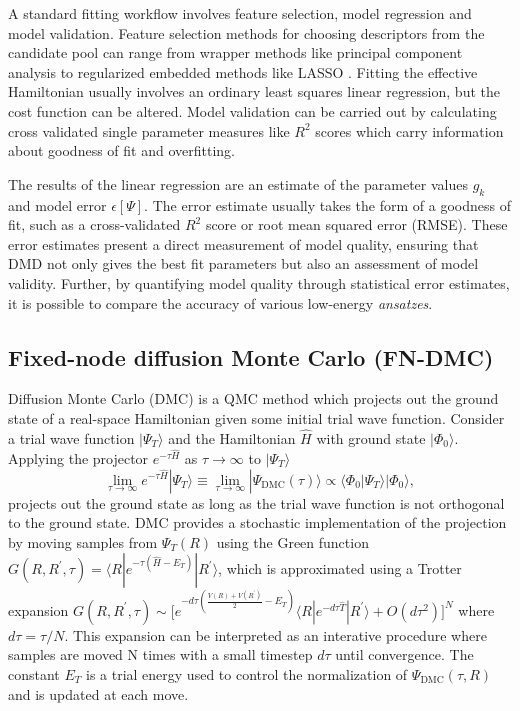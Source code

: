\documentclass[12pt]{article}
\begin{document}
A standard fitting workflow involves feature selection, model regression and model validation.
Feature selection methods for choosing descriptors from the candidate pool can range from wrapper methods like principal component analysis \cite{pearson_karl_1901_1430636} to regularized embedded methods like LASSO \cite{10.2307/2346178, doi:10.1137/S0895479897326432, Zou05regularizationand}. 
Fitting the effective Hamiltonian usually involves an ordinary least squares linear regression, but the cost function can be altered.
Model validation can be carried out by calculating cross validated single parameter measures like $R^2$ scores which carry information about goodness of fit and overfitting.

The results of the linear regression are an estimate of the parameter values $g_k$ and model error $\epsilon[\Psi]$.
The error estimate usually takes the form of a goodness of fit, such as a cross-validated $R^2$ score or root mean squared error (RMSE).
These error estimates present a direct measurement of model quality, ensuring that DMD not only gives the best fit parameters but also an assessment of model validity.
Further, by quantifying model quality through statistical error estimates, it is possible to compare the accuracy of various low-energy \textit{ansatzes}.

\subsection{Fixed-node diffusion Monte Carlo (FN-DMC)}
Diffusion Monte Carlo (DMC) is a QMC method which projects out the ground state of a real-space Hamiltonian given some initial trial wave function.
Consider a trial wave function $|\Psi_T\rangle$ and the Hamiltonian $\hat{H}$ with ground state $|\Phi_0\rangle$. 
Applying the projector $e^{-\tau \hat{H}}$ as $\tau \rightarrow \infty$ to $|\Psi_T \rangle$
\begin{equation}
\lim_{\tau \rightarrow \infty} e^{-\tau \hat{H}} |\Psi_T\rangle 
\equiv \lim_{\tau \rightarrow \infty} |\Psi_\text{DMC}(\tau)\rangle \propto \langle \Phi_0|\Psi_T\rangle |\Phi_0\rangle,
\end{equation}
projects out the ground state as long as the trial wave function is not orthogonal to the ground state. 
DMC provides a stochastic implementation of the projection by moving samples from $\Psi_T(R)$ using the Green function $G(R, R^\prime, \tau) = \langle R | e^{-\tau(\hat{H} - E_T)} | R^\prime \rangle$, which is approximated using a Trotter expansion $G(R, R^\prime, \tau) \sim \Big[e^{-d\tau(\frac{V(R) + V(R^\prime)}{2} - E_T)} \langle R| e^{-d\tau\hat{T}}|R^\prime \rangle + O(d\tau^2) \Big]^N $ 
where $d\tau = \tau/N$.
This expansion can be interpreted as an interative procedure where samples are moved N times with a small timestep $d\tau$ until convergence.
The constant $E_T$ is a trial energy used to control the normalization of $\Psi_\text{DMC}(\tau, R)$ and is updated at each move.
\end{document}

